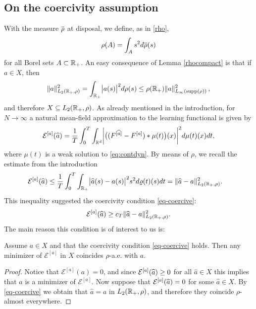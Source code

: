 \subsection{On the coercivity assumption}\label{sec:coerc}

With the measure $\overline\rho$ at disposal, we define, as in \eqref{rho},  $$\rho(A) = \int_{A} s^2 d\overline\rho(s)$$ for all Borel sets $A \subset \mathbb{R}_+$.  An easy consequence of Lemma \ref{rhocompact} is that if $a\in X$, then
\begin{align}\label{eq:inftyimplyl2}
\|a\|^2_{L_2(\mathbb{R}_+,\rho)} = \int_{\mathbb{R}_+} \bigl|a(s)\bigr|^2 d\rho(s) \leq \rho(\mathbb R_+)\|a\|^2_{L_{\infty}(\operatorname{supp}(\rho))}\,,
\end{align}
and therefore $X\subseteq L_2(\mathbb{R}_+,\rho)$.  
As already mentioned in the introduction, for $N \to \infty$ a natural mean-field approximation to the learning functional is given by
\begin{align*}
	\mathcal E^{[a]}(\widehat a)=\frac{1}{T}\int_0^T \int_{\mathbb{R}^d} \biggl|\bigl((F^{[\widehat a]}-F^{[a]})\ast\mu(t)\bigr)(x)\biggr|^2d\mu(t)(x)dt,
\end{align*}
where $\mu(t)$ is a weak solution to \eqref{eq:contdyn}. 
By means of $\rho$, we recall the estimate from the introduction
\begin{align}
\begin{split}\label{eq-rho-3}
	\mathcal E^{[a]}(\widehat a)&\leq\frac{1}{T}\int_0^T\int_{\mathbb{R}_+}\bigl|\widehat a(s)-a(s)\bigr|^2 s^2 d\varrho(t)(s) dt = \|\widehat a-a\|^2_{L_2(\mathbb{R}_+,\rho)}.
\end{split}
\end{align}
This inequality suggested the coercivity condition \eqref{eq-coercive}: 
{$$
	\mathcal E^{[a]}(\widehat a)\geq c_T\|\widehat a-a\|^2_{L_2(\mathbb{R}_+,\rho)}.
$$}
The main reason this condition is of interest to us is:

\begin{proposition}\label{uniquemin}
Assume $a \in X$ and that the coercivity condition \eqref{eq-coercive} holds. Then any minimizer of $\mathcal E^{[a]}$ in $X$ coincides $\rho$-a.e. with $a$.
\end{proposition}
\begin{proof}
Notice that $\mathcal E^{[a]}(a)=0$, and since $\mathcal E^{[a]}(\widehat a)\geq 0$ for all $\widehat a\in X$ this implies that $a$ is a minimizer of $\mathcal E^{[a]}$. Now suppose that $ \mathcal E^{[a]}(\widehat a)=0$ for some $\widehat a\in X$. By \eqref{eq-coercive} we obtain that $\widehat a=a$ in $L_2(\mathbb{R}_+,\rho)$, and therefore they coincide $\rho$-almost everywhere. %
\end{proof}



